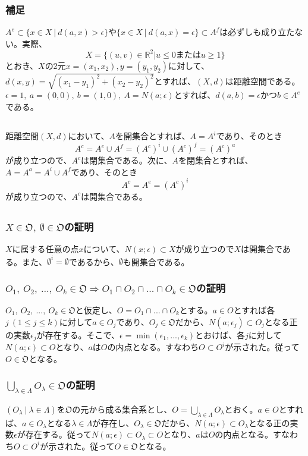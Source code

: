\documentclass{jsarticle}
\begin{document}
\subsubsection{補足}
$A^e\subset \{x\in X\ |\ d(a,x)>\epsilon\}$や$\{x\in X\ |\ d(a,x)=\epsilon\}\subset A^f$は必ずしも成り立たない。実際、
\[X=\{(u,v)\in \mathbb{R}^2|u\leq0 または u\geq 1\}\]
とおき、$X$の2元$x=(x_1,x_2),y=(y_1,y_2)$に対して、$d(x,y)=\sqrt{(x_1-y_1)^2+(x_2-y_2)^2}$とすれば、$(X,d)$は距離空間である。$\epsilon=1,\ a=(0,0),\ b=(1,0),\ A=N(a;\epsilon)$とすれば、$d(a,b)=\epsilon$かつ$b\in A^e$である。

\subsection{}
距離空間$(X,d)$において、$A$を開集合とすれば、$A=A^i$であり、そのとき
\[A^c=A^e\cup A^f=(A^c)^i\cup(A^c)^f=(A^c)^a\]
が成り立つので、$A^c$は閉集合である。次に、$A$を閉集合とすれば、$A=A^a=A^i\cup A^f$であり、そのとき
\[A^c=A^e=(A^c)^i\]
が成り立つので、$A^c$は開集合である。

\subsection{}
\subsubsection{$X\in \mathfrak{O},\ \emptyset\in\mathfrak{O}$の証明}
$X$に属する任意の点$x$について、$N(x;\epsilon)\subset X$が成り立つので$X$は開集合である。また、$\emptyset^i=\emptyset$であるから、$\emptyset$も開集合である。

\subsubsection{$O_1,\ O_2,\ ...,\ O_k\in\mathfrak{O}\Longrightarrow O_1\cap O_2\cap...\cap O_k\in\mathfrak{O}$の証明}
$O_1,\ O_2,\ ...,\ O_k\in\mathfrak{O}$と仮定し、$O=O_1\cap...\cap O_k$とする。$a\in O$とすれば各$j\ (1\leq j\leq k)$に対して$a\in O_j$であり、$O_j\in\mathfrak{O}$だから、$N(a;\epsilon_j)\subset O_j$となる正の実数$\epsilon_j$が存在する。そこで、$\epsilon=\min(\epsilon_1,...,\epsilon_k)$とおけば、各$j$に対して$N(a;\epsilon)\subset O$となり、$a$は$O$の内点となる。すなわち$O\subset O^i$が示された。従って$O\in\mathfrak{O}$となる。

\subsubsection{$\bigcup_{\lambda\in\Lambda}O_\lambda\in\mathfrak{O}$の証明}
$(O_\lambda\ |\ \lambda\in\Lambda)$を$\mathfrak{O}$の元から成る集合系とし、$O=\bigcup_{\lambda\in\Lambda}O_\lambda$とおく。$a\in O$とすれば、$a\in O_\lambda$となる$\lambda\in\Lambda$が存在し、$O_\lambda\in\mathfrak{O}$だから、$N(a;\epsilon)\subset O_\lambda$となる正の実数$\epsilon$が存在する。従って$N(a;\epsilon)\subset O_\lambda\subset O$となり、$a$は$O$の内点となる。すなわち$O\subset O^i$が示された。従って$O\in\mathfrak{O}$となる。
\end{document}
